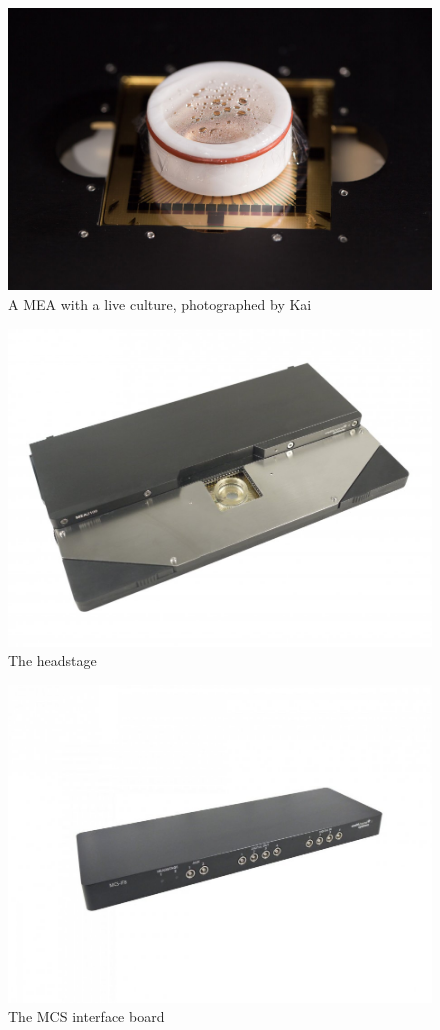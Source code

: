 \begin{figure}[h!]
    \includegraphics[width=\linewidth]{images/st-olavs-mea.jpg}
    \caption{A MEA with a live culture, photographed by Kai}
    \label{fig:st_olav_MEA}
\end{figure}
\begin{figure}[h!]
    \includegraphics[width=\linewidth]{images/MEA2100-HS60.jpg}
    \caption{The headstage}
    \label{fig:headstage}
\end{figure}
\begin{figure}[h!]
    \includegraphics[width=\linewidth]{images/MCS-IFB.jpg}
    \caption{The MCS interface board}
    \label{fig:neuron_anatomy}
\end{figure}
